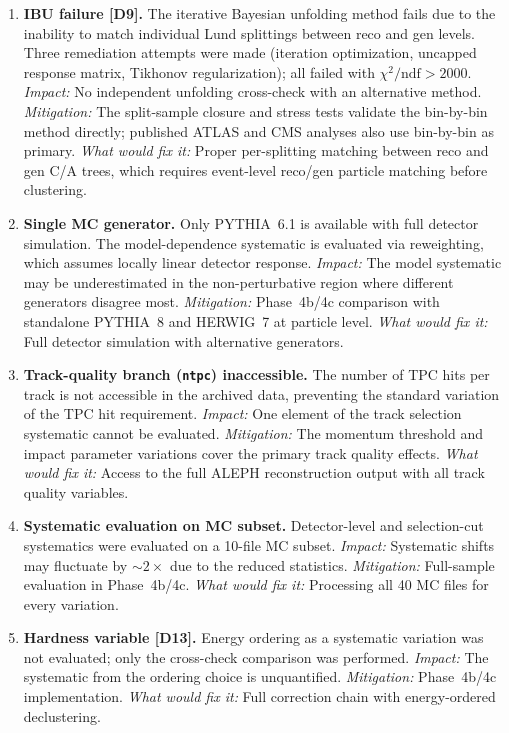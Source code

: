 \documentclass[11pt,a4paper]{article}
\begin{document}
\begin{enumerate}
\item \textbf{IBU failure [D9].}  The iterative Bayesian unfolding
  method fails due to the inability to match individual Lund splittings
  between reco and gen levels.  Three remediation attempts were made
  (iteration optimization, uncapped response matrix, Tikhonov
  regularization); all failed with $\chi^2/\text{ndf} > 2000$.
  \emph{Impact:} No independent unfolding cross-check with an
  alternative method.  \emph{Mitigation:} The split-sample closure and
  stress tests validate the bin-by-bin method directly; published ATLAS
  and CMS analyses also use bin-by-bin as primary.
  \emph{What would fix it:} Proper per-splitting matching between reco
  and gen C/A trees, which requires event-level reco/gen particle
  matching before clustering.

\item \textbf{Single MC generator.}  Only PYTHIA~6.1 is available with
  full detector simulation.  The model-dependence systematic is
  evaluated via reweighting, which assumes locally linear detector
  response.  \emph{Impact:} The model systematic may be underestimated
  in the non-perturbative region where different generators disagree
  most.  \emph{Mitigation:} Phase~4b/4c comparison with standalone
  PYTHIA~8 and HERWIG~7 at particle level.
  \emph{What would fix it:} Full detector simulation with alternative
  generators.

\item \textbf{Track-quality branch (\texttt{ntpc}) inaccessible.}  The
  number of TPC hits per track is not accessible in the archived data,
  preventing the standard variation of the TPC hit requirement.
  \emph{Impact:} One element of the track selection systematic cannot be
  evaluated.  \emph{Mitigation:} The momentum threshold and impact
  parameter variations cover the primary track quality effects.
  \emph{What would fix it:} Access to the full ALEPH reconstruction
  output with all track quality variables.

\item \textbf{Systematic evaluation on MC subset.}  Detector-level
  and selection-cut systematics were evaluated on a 10-file MC subset.
  \emph{Impact:} Systematic shifts may fluctuate by $\sim\!2\times$ due
  to the reduced statistics.  \emph{Mitigation:} Full-sample evaluation
  in Phase~4b/4c.
  \emph{What would fix it:} Processing all 40 MC files for every
  variation.

\item \textbf{Hardness variable [D13].}  Energy ordering as a
  systematic variation was not evaluated; only the cross-check
  comparison was performed.  \emph{Impact:} The systematic from the
  ordering choice is unquantified.  \emph{Mitigation:} Phase~4b/4c
  implementation.
  \emph{What would fix it:} Full correction chain with energy-ordered
  declustering.
\end{enumerate}
\end{document}
